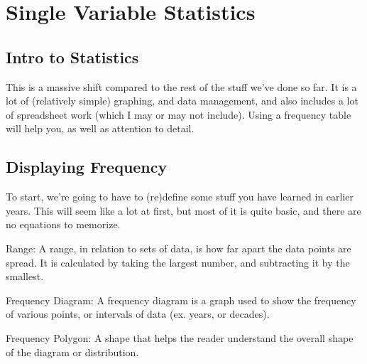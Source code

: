 \section{Single Variable Statistics}
    
    \subsection{Intro to Statistics}
    This is a massive shift compared to the rest of the stuff we've done so far. It is a lot of (relatively simple) graphing, and data management, and also includes a lot of spreadsheet work (which I may or may not include). Using a frequency table will help you, as well as attention to detail.
    
    \subsection{Displaying Frequency}
    To start, we're going to have to (re)define some stuff you have learned in earlier years. This will seem like a lot at first, but most of it is quite basic, and there are no equations to memorize.
    \begin{definition}
        Range: A range, in relation to sets of data, is how far apart the data points are spread. It is calculated by taking the largest number, and subtracting it by the smallest. 
    \end{definition}
    \begin{definition}
        Frequency Diagram: A frequency diagram is a graph used to show the frequency of various points, or intervals of data (ex. years, or decades). 
    \end{definition}
    \begin{definition}
        Frequency Polygon: A shape that helps the reader understand the overall shape of the diagram or distribution.
    \end{definition}
    \begin{center}
    \end{center}

